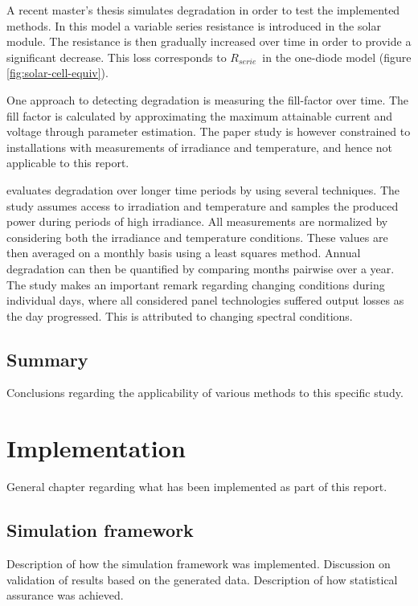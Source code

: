 A recent master's thesis\cite{Zhao2010thesis} simulates degradation in order to test the implemented methods.
In this model a variable series resistance is introduced in the solar module.
The resistance is then gradually increased over time in order to provide a significant decrease.
This loss corresponds to $R_{serie}$ in the one-diode model (figure \ref{fig:solar-cell-equiv}).

One approach to detecting degradation is measuring the fill-factor over time\cite{Raina2013}.
The fill factor is calculated by approximating the maximum attainable current and voltage through parameter estimation.
The paper study is however constrained to installations with measurements of irradiance and temperature, and hence not applicable to this report.

\cite{Makrides2010} evaluates degradation over longer time periods by using several techniques.
The study assumes access to irradiation and temperature and samples the produced power during periods of high irradiance.
All measurements are normalized by considering both the irradiance and temperature conditions.
These values are then averaged on a monthly basis using a least squares method.
Annual degradation can then be quantified by comparing months pairwise over a year.
The study makes an important remark regarding changing conditions during individual days, where all considered panel technologies suffered output losses as the day progressed.
This is attributed to changing spectral conditions.


\section{Summary}
Conclusions regarding the applicability of various methods to this specific study.

\chapter{Implementation}
General chapter regarding what has been implemented as part of this report.

\section{Simulation framework}
Description of how the simulation framework was implemented.
Discussion on validation of results based on the generated data.
Description of how statistical assurance was achieved.

